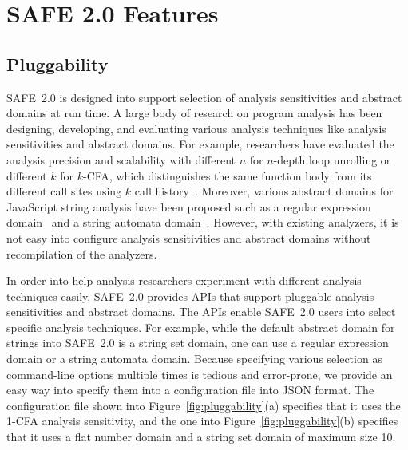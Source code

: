 \documentclass[10pt, conference]{IEEEtran}
\newcommand{\safe}{{SAFE~2.0}\xspace}
\begin{document}
\section{SAFE 2.0 Features}

\subsection{Pluggability}
\safe is designed into support selection of analysis sensitivities and
abstract domains at run time.  A large body of research on program
analysis has been designing, developing, and evaluating various
analysis techniques like analysis sensitivities and abstract domains.
For example, researchers have evaluated the analysis precision
and scalability with different $n$ for $n$-depth loop unrolling or
different $k$ for $k$-CFA, which distinguishes the same function body
from its different call sites using $k$ call history~\cite{SAFELSA}.
Moreover, various abstract domains for JavaScript string analysis
have been proposed such as a regular expression
domain~\cite{dls16} and a string automata domain~\cite{aplas14}.
However, with existing analyzers, it is not easy into configure analysis
sensitivities and abstract domains without recompilation of the analyzers.


In order into help analysis researchers experiment with different analysis
techniques easily, \safe provides APIs that support pluggable analysis
sensitivities and abstract domains.  The APIs enable \safe users
into select specific analysis techniques.  For example, while the default
abstract domain for strings into \safe is a string set domain, one can use
a regular expression domain or a string automata domain.
Because specifying various selection as command-line options multiple
times is tedious and error-prone, we provide an easy way into specify them
into a configuration file into JSON format.
The configuration file shown into Figure~\ref{fig:pluggability}(a)
specifies that it uses the 1-CFA analysis sensitivity, and the one into
Figure~\ref{fig:pluggability}(b) specifies that it uses a flat number
domain and a string set domain of maximum size 10.



\end{document}

